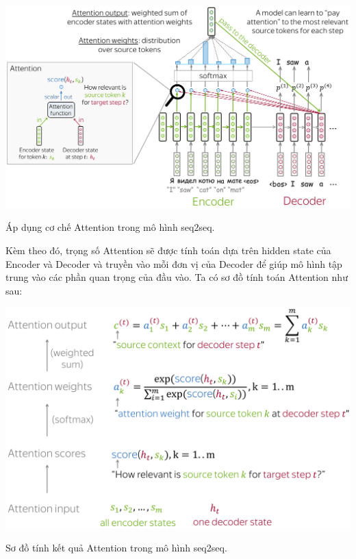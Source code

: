\documentclass[a4paper, 12pt, openany]{book}
\begin{document}
\begin{minipage}{\linewidth}
    \captionsetup{type=figure}
    \centering
    \includegraphics[width=\linewidth]{./assets/images/seq2seq_attention.png}
    \caption{Áp dụng cơ chế Attention trong mô hình \ac{seq2seq}.}
\end{minipage}
\vspace{0.5cm}

Kèm theo đó, trọng số Attention sẽ được tính toán dựa trên hidden state của Encoder và Decoder và 
truyền vào mỗi đơn vị của Decoder để giúp mô hình tập trung vào các phần quan trọng của đầu vào. Ta có sơ đồ tính toán Attention như sau:

\begin{minipage}{\linewidth}
    \captionsetup{type=figure}
    \centering
    \includegraphics[width=\linewidth]{./assets/images/computation_scheme-min.png}
    \caption{Sơ đồ tính kết quả Attention trong mô hình \ac{seq2seq}.}
\end{minipage}
\vspace{0.5cm}
\end{document}
